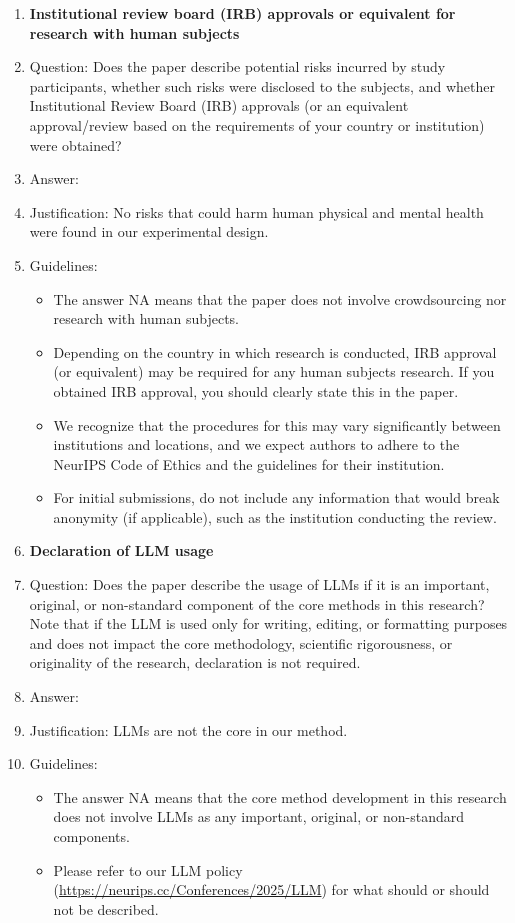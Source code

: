 \documentclass{article}
\begin{document}
\begin{enumerate}
\item {\bf Institutional review board (IRB) approvals or equivalent for research with human subjects}
    \item[] Question: Does the paper describe potential risks incurred by study participants, whether such risks were disclosed to the subjects, and whether Institutional Review Board (IRB) approvals (or an equivalent approval/review based on the requirements of your country or institution) were obtained?
    \item[] Answer: \answerNA{} %
    \item[] Justification: No risks that could harm human physical and mental health were found in our experimental design.
    \item[] Guidelines:
    \begin{itemize}
        \item The answer NA means that the paper does not involve crowdsourcing nor research with human subjects.
        \item Depending on the country in which research is conducted, IRB approval (or equivalent) may be required for any human subjects research. If you obtained IRB approval, you should clearly state this in the paper. 
        \item We recognize that the procedures for this may vary significantly between institutions and locations, and we expect authors to adhere to the NeurIPS Code of Ethics and the guidelines for their institution. 
        \item For initial submissions, do not include any information that would break anonymity (if applicable), such as the institution conducting the review.
    \end{itemize}

\item {\bf Declaration of LLM usage}
    \item[] Question: Does the paper describe the usage of LLMs if it is an important, original, or non-standard component of the core methods in this research? Note that if the LLM is used only for writing, editing, or formatting purposes and does not impact the core methodology, scientific rigorousness, or originality of the research, declaration is not required.
    \item[] Answer: \answerNA{} %
    \item[] Justification: LLMs are not the core in our method.
    \item[] Guidelines:
    \begin{itemize}
        \item The answer NA means that the core method development in this research does not involve LLMs as any important, original, or non-standard components.
        \item Please refer to our LLM policy (\url{https://neurips.cc/Conferences/2025/LLM}) for what should or should not be described.
    \end{itemize}

\end{enumerate}
\end{document}
